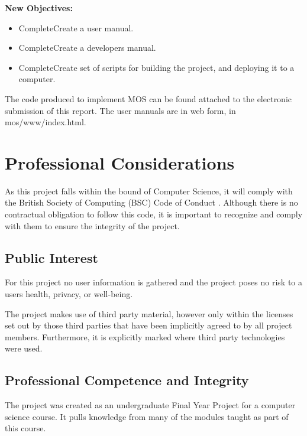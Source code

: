 \documentclass[a4paper]{report}
\begin{document}
\textbf {New Objectives:}

\begin{itemize}
\item \lbrack Complete\rbrack Create a user manual.
\item \lbrack Complete\rbrack Create a developers manual.
\item \lbrack Complete\rbrack Create set of scripts for building the project, and deploying it to a computer.
\end{itemize}

The code produced to implement MOS can be found attached to the electronic submission of this report. The user manuals are in web form, in mos/www/index.html.













\chapter{Professional Considerations}

As this project falls within the bound of Computer Science, it will comply with the British Society of Computing (BSC) Code of Conduct \cite{CoC}. Although there is no contractual obligation to follow this code, it is important to recognize and comply with them to ensure the integrity of the project.

\section{Public Interest}

For this project no user information is gathered and the project poses no risk to a users health, privacy, or well-being.

The project makes use of third party material, however only within the licenses set out by those third parties that have been implicitly agreed to by all project members. Furthermore, it is explicitly marked where third party technologies were used.


\section{Professional Competence and Integrity}

The project was created as an undergraduate Final Year Project for a computer science course. It pulls knowledge from many of the modules taught as part of this course.
\end{document}
